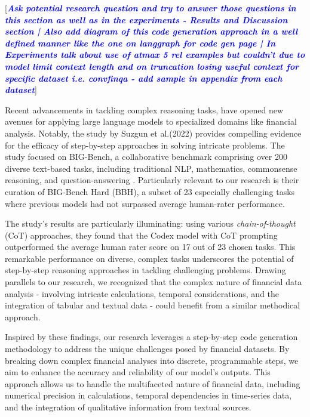\documentclass[logo,msc]{infthesis}           %
\begin{document}
[\textcolor{blue}{\textit{\textbf{Ask potential research question and try to answer those questions in this section as well as in the experiments - Results and Discussion section | Also add diagram of this code generation approach in a well defined manner like the one on langgraph for code gen page | In Experiments talk about use of atmax 5 rel examples but couldn't due to model limit context length and on truncation losing useful context for specific dataset i.e. convfinqa - add sample in appendix from each dataset}}}]

Recent advancements in tackling complex reasoning tasks, have opened new avenues for applying large language models to specialized domains like financial analysis. Notably, the study by Suzgun et al.(2022) provides compelling evidence for the efficacy of step-by-step approaches in solving intricate problems. The study focused on BIG-Bench, a collaborative benchmark comprising over 200 diverse text-based tasks, including traditional NLP, mathematics, commonsense reasoning, and question-answering \cite{suzgun2022challenging}. Particularly relevant to our research is their curation of BIG-Bench Hard (BBH), a subset of 23 especially challenging tasks where previous models had not surpassed average human-rater performance.

The study's results are particularly illuminating: using various \textit{chain-of-thought} (CoT) approaches, they found that the Codex model with CoT prompting outperformed the average human rater score on 17 out of 23 chosen tasks. This remarkable performance on diverse, complex tasks underscores the potential of step-by-step reasoning approaches in tackling challenging problems. Drawing parallels to our research, we recognized that the complex nature of financial data analysis - involving intricate calculations, temporal considerations, and the integration of tabular and textual data - could benefit from a similar methodical approach.

Inspired by these findings, our research leverages a step-by-step code generation methodology to address the unique challenges posed by financial datasets. By breaking down complex financial analyses into discrete, programmable steps, we aim to enhance the accuracy and reliability of our model's outputs. This approach allows us to handle the multifaceted nature of financial data, including numerical precision in calculations, temporal dependencies in time-series data, and the integration of qualitative information from textual sources.
\end{document}

